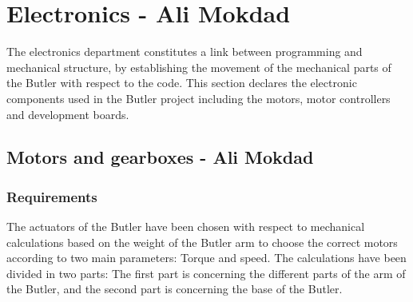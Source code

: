 
\section{Electronics - Ali Mokdad}
The electronics department constitutes a link between programming and mechanical structure, by establishing the movement of the mechanical parts of the Butler with respect to the code. This section declares the electronic components used in the Butler project including the motors, motor controllers and development boards.

\subsection{Motors and gearboxes - Ali Mokdad}  \label{MotorsNGearboxes}


\subsubsection{Requirements}
The actuators of the Butler have been chosen with respect to mechanical calculations based on the weight of the Butler arm to choose the correct motors according to two main parameters: Torque and speed. The calculations have been divided in two parts: The first part is concerning the different parts of the arm of the Butler, and the second part is concerning the base of the Butler. 

